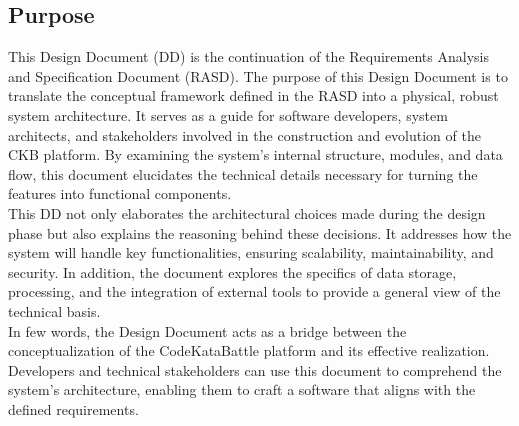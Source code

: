 \subsection{Purpose}
This Design Document (DD) is the continuation of the Requirements Analysis and Specification Document (RASD). The purpose of this Design Document is to translate the conceptual framework defined in the RASD into a physical, robust system architecture. It serves as a guide for software developers, system architects, and stakeholders involved in the construction and evolution of the CKB platform. By examining the system's internal structure, modules, and data flow, this document elucidates the technical details necessary for turning the features into functional components. \\
This DD not only elaborates the architectural choices made during the design phase but also explains the reasoning behind these decisions. It addresses how the system will handle key functionalities, ensuring scalability, maintainability, and security. In addition, the document explores the specifics of data storage, processing, and the integration of external tools to provide a general view of the technical basis. \\
In few words, the Design Document acts as a bridge between the conceptualization of the CodeKataBattle platform and its effective realization. Developers and technical stakeholders can use this document to comprehend the system's architecture, enabling them to craft a software that aligns with the defined requirements.



